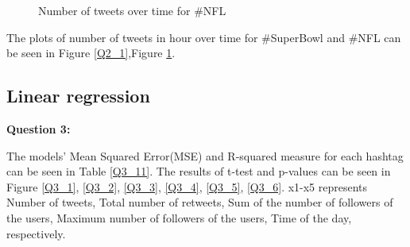\documentclass{article}
\begin{document}
\begin{figure}
\centering
{}
\caption{Number of tweets over time for \#NFL} \label{Q2_2}
\end{figure}

The plots of number of tweets in hour over time for \#SuperBowl and \#NFL can be seen in Figure \ref{Q2_1},Figure \ref{Q2_2}.


\bigbreak
\subsection{Linear regression}
\textbf{Question 3:}

\begin{table}[h]
\center
\caption{MSE and R-squared measure}
\label{Q3_11}
\end{table}


The models' Mean Squared Error(MSE) and R-squared measure for each hashtag can be seen in Table \ref{Q3_11}. The results of t-test and p-values can be seen in Figure \ref{Q3_1}, \ref{Q3_2}, \ref{Q3_3}, \ref{Q3_4}, \ref{Q3_5}, \ref{Q3_6}. x1-x5 represents Number of tweets, Total number of retweets, Sum of the number of followers of the users, Maximum number of followers of the users, Time of the day, respectively.
\end{document}
